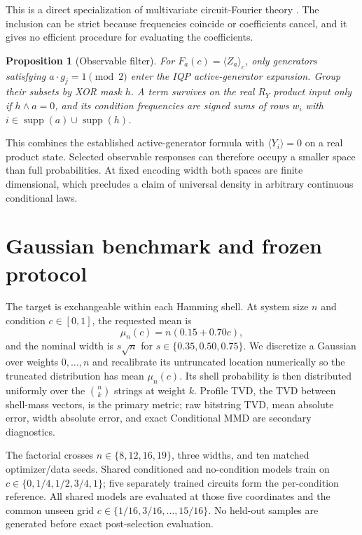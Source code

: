 \documentclass[a4paper,twocolumn,11pt,unpublished]{quantumarticle}
\newtheorem{proposition}{Proposition}
\newcommand{\supp}{\operatorname{supp}}
\begin{document}
This is a direct specialization of multivariate circuit-Fourier theory
\cite{gilVidalInputRedundancy2020,schuldEffectDataEncoding2021,
casasMultidimensionalFourier2023}.  The inclusion can be strict because
frequencies coincide or coefficients cancel, and it gives no efficient
procedure for evaluating the coefficients.

\begin{proposition}[Observable filter]
For $F_a(c)=\langle Z_a\rangle_c$, only generators satisfying
$a\cdot g_j=1\pmod2$ enter the IQP active-generator expansion.  Group their
subsets by XOR mask $h$.  A term survives on the real $R_Y$ product input only
if $h\wedge a=0$, and its condition frequencies are signed sums of rows
$w_i$ with $i\in\supp(a)\cup\supp(h)$.
\end{proposition}

This combines the established active-generator formula
\cite{recio-armengolTrainClassicalDeploy2026} with
$\langle Y_i\rangle=0$ on a real product state.  Selected observable responses
can therefore occupy a smaller space than full probabilities.  At fixed
encoding width both spaces are finite dimensional, which precludes a claim of
universal density in arbitrary continuous conditional laws.

\section{Gaussian benchmark and frozen protocol}
\label{sec:protocol}

The target is exchangeable within each Hamming shell.  At system size $n$ and
condition $c\in[0,1]$, the requested mean is
\begin{equation}
 \mu_n(c)=n(0.15+0.70c),
\end{equation}
and the nominal width is $s\sqrt n$ for
$s\in\{0.35,0.50,0.75\}$.  We discretize a Gaussian over weights
$0,\ldots,n$ and recalibrate its untruncated location numerically so the
truncated distribution has mean $\mu_n(c)$.  Its shell probability is then
distributed uniformly over the $\binom nk$ strings at weight $k$.  Profile TVD,
the TVD between shell-mass vectors, is the primary metric; raw bitstring TVD,
mean absolute error, width absolute error, and exact Conditional MMD are
secondary diagnostics.

The factorial crosses $n\in\{8,12,16,19\}$, three widths, and ten matched
optimizer/data seeds.  Shared conditioned and no-condition models train on
$c\in\{0,1/4,1/2,3/4,1\}$; five separately trained circuits form the
per-condition reference.  All shared models are evaluated at those
five coordinates and the
common unseen grid $c\in\{1/16,3/16,\ldots,15/16\}$.  No held-out samples are
generated before exact post-selection evaluation.
\end{document}
